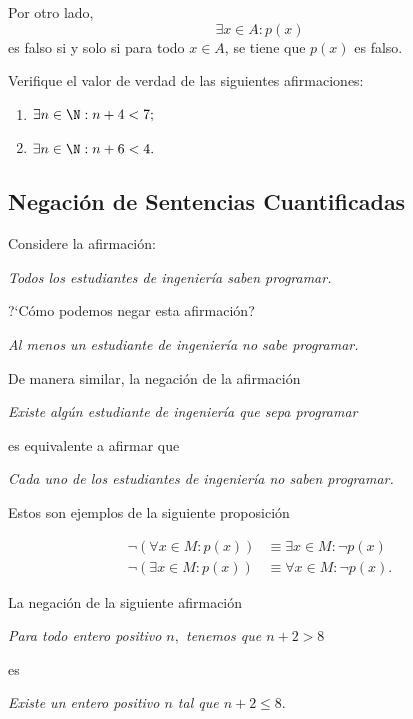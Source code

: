 Por otro lado,  $$\exists x\in A: p(x)$$ es falso si y solo si para todo $ x\in A $, se tiene que $ p(x) $ es falso.



 Verifique el valor de verdad de las siguientes afirmaciones:
 \begin{enumerate}
  \item $\exists n  \in \N: n+4<7;$ 
  \item $\exists n \in \N: n+6<4.$
 \end{enumerate}



\subsection{Negación de Sentencias Cuantificadas}



 Considere la afirmación:
 \begin{center}
  \emph{Todos los estudiantes de ingeniería saben programar.}
 \end{center}
?`Cómo podemos negar esta afirmación?


\begin{center}
 \emph{Al menos un estudiante de ingeniería no sabe programar.}
\end{center} 


 De manera similar, la negación de la afirmación
 \begin{center}
  \emph{Existe algún estudiante de ingeniería que sepa programar}
 \end{center}
 es equivalente a afirmar que 
 \begin{center}
  \emph{Cada uno de los estudiantes de ingeniería no saben programar.}
 \end{center}

Estos son ejemplos de la siguiente proposición

 \begin{thm}[DeMorgan]
  \begin{align}
  \label{lip:thm:4.4}
   \neg\left( \forall x\in M: p(x) \right)& \equiv \exists x\in M: \neg p(x)\\
   \label{lip:thm:4.5}
   \neg\left( \exists x\in M: p(x) \right)& \equiv \forall x\in M: \neg p(x).
  \end{align}

 \end{thm}




 \begin{ejemplo}
  \label{lip:exmp:4.10.a}
  La negación de la siguiente afirmación
  \begin{center}
   \emph{Para todo entero positivo $n,$ tenemos que $n+2>8$}
  \end{center}
es 
\begin{center}
 \emph{Existe un entero positivo $n$ tal que $n+2 \leq 8.$}
\end{center}

 \end{ejemplo}




